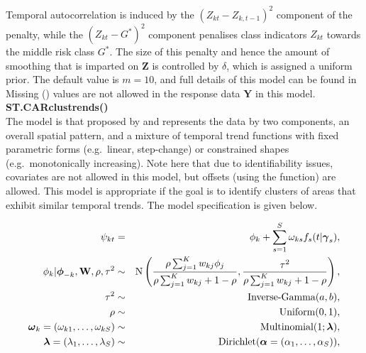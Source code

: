 \documentclass[article, nojss]{jss}
\newcommand{\bd}[1]{\ensuremath{\mbox{\boldmath $#1$}}}
\begin{document}
Temporal autocorrelation is induced by the $(Z_{kt}-Z_{k,t-1})^{2}$ component of the penalty, while the $(Z_{kt}-G^{*})^{2}$ component penalises class indicators $Z_{kt}$ towards the middle risk class $G^{*}$. The size of this penalty and hence the amount of smoothing that is imparted on $\mathbf{Z}$ is controlled by $\delta$, which is assigned a uniform prior. The default value is $m=10$, and full details of this model can be found in \cite{lee2016} Missing () values are not allowed in the response data $\mathbf{Y}$ in this model.\\

\textbf{ST.CARclustrends()}\\
The model is that proposed by \cite{napier2018} and represents the data by two components, an overall spatial pattern, and  a mixture of temporal trend functions with fixed parametric forms (e.g.\ linear, step-change) or constrained shapes (e.g.\ monotonically increasing). Note here that due to identifiability issues, covariates are not allowed in this model, but offsets (using the  function) are allowed. This model is appropriate if the goal is to identify clusters of areas that exhibit similar temporal trends. The model specification is given below.

\begin{eqnarray}
\psi_{kt} &=& \phi_k +  \sum_{s=1}^S   \omega_{ks} f_s(t|\bd{\gamma}_s),\label{carclustrends}\\
\phi_k|\bd{\phi}_{-k},\mathbf{W},\rho, \tau^2&\sim&\mbox{N}\left(\frac{\rho\sum_{j=1}^K w_{kj}\phi_j}{\rho\sum_{j=1}^Kw_{kj} + 1-\rho}, \frac{\tau^2}{\rho\sum_{j=1}^K w_{kj} + 1-\rho}\right),\nonumber\\
\tau^2 &\sim&\mbox{Inverse-Gamma}(a,b),\nonumber\\
\rho&\sim&\mbox{Uniform}(0,1),\nonumber\\
\bd{\omega}_k= (\omega_{k1}, \ldots, \omega_{kS}) &\sim& \mbox{Multinomial}(1; \bd{\lambda}),\nonumber\\
\bd{\lambda} = (\lambda_1,\ldots,\lambda_S)&\sim&\mbox{Dirichlet}(\bd{\alpha}= (\alpha_1, \ldots, \alpha_S)),\nonumber
\end{eqnarray}
\end{document}
